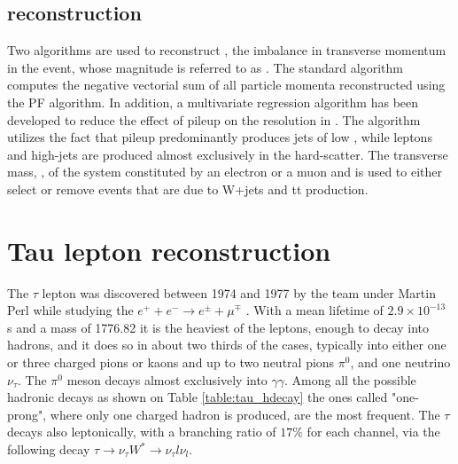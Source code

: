 \subsection {\met reconstruction}

Two algorithms are used to reconstruct \ptvecmiss, the imbalance in transverse momentum in the event, whose magnitude is referred to as \met. The standard algorithm computes the negative vectorial sum of all particle momenta reconstructed using the PF algorithm. In addition, a multivariate regression algorithm \cite{Khachatryan:2014gga} has been developed to reduce the effect of pileup on the resolution in \met. The algorithm utilizes the fact that pileup predominantly produces jets of low \pt, while leptons and high-\pt jets are produced almost exclusively in the hard-scatter. The transverse mass, \mt, of the system constituted by an electron or a muon and \met is used to either select or remove events that are due to W+jets and tt production. 

\clearpage

\section {Tau lepton reconstruction}

The $\tau$ lepton was discovered between 1974 and 1977 by the team under Martin Perl while studying the $e^{+}+e^{-}\longrightarrow e^{\pm}+\mu^{\mp}$ \cite{Perl:1975bf}. With a mean lifetime of $2.9\times10^{-13}$ s and a mass of 1776.82 \mev \cite{Agashe:2014kda} it is the heaviest of the leptons, enough to decay into hadrons, and it does so in about two thirds of the cases, typically into either one or three charged pions or kaons and up to two neutral pions \ensuremath{\pi^{0}}, and one neutrino \ensuremath{\nu_{\tau}}. The \ensuremath{\pi^{0}} meson decays almost exclusively into \ensuremath{\gamma\gamma}. Among all the possible hadronic decays as shown on Table \ref{table:tau_hdecay} the ones called "one-prong", where only one charged hadron is produced, are the most frequent. The $\tau$ decays also leptonically, with a branching ratio of $17\%$ for each channel, via the following decay $\tau\longrightarrow\nu_{\tau}W^{*}\longrightarrow\nu_{\tau}l\nu_{l}$.

